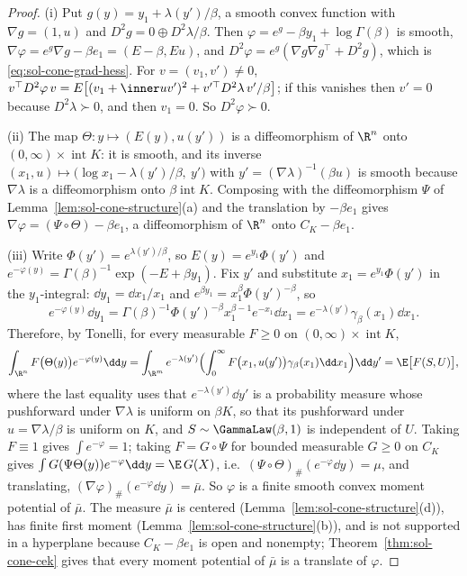 \documentclass[../main.tex]{subfiles}
\begin{document}
\begin{proof}
(i) Put $g(y)=y_1+\lambda(y')/\beta$, a smooth convex function with
$\nabla g=(1,u)$ and $D^2g=0\oplus D^2\lambda/\beta$.  Then $\varphi=e^g-\beta y_1+\log\Gamma(\beta)$
is smooth, $\nabla\varphi=e^g\nabla g-\beta e_1=(E-\beta,Eu)$, and
$D^2\varphi=e^g(\nabla g\nabla g^\top+D^2g)$, which is \eqref{eq:sol-cone-grad-hess}.  For
$v=(v_1,v')\ne0$,
$v^\top D^2\varphi\,v=E\bigl[(v_1+\inner u{v'})^2+v'^\top D^2\lambda\,v'/\beta\bigr]$; if this
vanishes then $v'=0$ because $D^2\lambda\succ0$, and then $v_1=0$.  So $D^2\varphi\succ0$.

(ii) The map $\Theta:y\mapsto(E(y),u(y'))$ is a diffeomorphism of $\R^n$ onto
$(0,\infty)\times\operatorname{int}K$: it is smooth, and its inverse
$(x_1,u)\mapsto\bigl(\log x_1-\lambda(y')/\beta,\ y'\bigr)$ with $y'=(\nabla\lambda)^{-1}(\beta u)$
is smooth because $\nabla\lambda$ is a diffeomorphism onto $\beta\operatorname{int}K$.
Composing with the diffeomorphism $\Psi$ of Lemma~\ref{lem:sol-cone-structure}(a) and the
translation by $-\beta e_1$ gives $\nabla\varphi=(\Psi\circ\Theta)-\beta e_1$, a diffeomorphism
of $\R^n$ onto $C_K-\beta e_1$.

(iii) Write $\Phi(y')=e^{\lambda(y')/\beta}$, so $E(y)=e^{y_1}\Phi(y')$ and
$e^{-\varphi(y)}=\Gamma(\beta)^{-1}\exp(-E+\beta y_1)$.  Fix $y'$ and substitute
$x_1=e^{y_1}\Phi(y')$ in the $y_1$-integral: $\dd y_1=\dd x_1/x_1$ and
$e^{\beta y_1}=x_1^\beta\Phi(y')^{-\beta}$, so
\[
  e^{-\varphi(y)}\dd y_1
  =\Gamma(\beta)^{-1}\Phi(y')^{-\beta}x_1^{\beta-1}e^{-x_1}\dd x_1
  =e^{-\lambda(y')}\gamma_\beta(x_1)\dd x_1 .
\]
Therefore, by Tonelli, for every measurable $F\ge0$ on $(0,\infty)\times\operatorname{int}K$,
\begin{equation}
  \int_{\R^n}F\bigl(\Theta(y)\bigr)e^{-\varphi(y)}\dd y
  =\int_{\R^m}e^{-\lambda(y')}\Bigl(\int_0^\infty F\bigl(x_1,u(y')\bigr)\gamma_\beta(x_1)\dd x_1\Bigr)\dd y'
  =\E\bigl[F(S,U)\bigr],
  \label{eq:sol-cone-pushforward}
\end{equation}
where the last equality uses that $e^{-\lambda(y')}\dd y'$ is a probability measure whose
pushforward under $\nabla\lambda$ is uniform on $\beta K$, so that its pushforward under
$u=\nabla\lambda/\beta$ is uniform on $K$, and $S\sim\GammaLaw(\beta,1)$ is independent of $U$.
Taking $F\equiv1$ gives $\int e^{-\varphi}=1$; taking $F=G\circ\Psi$ for bounded measurable
$G\ge0$ on $C_K$ gives $\int G(\Psi\Theta(y))e^{-\varphi}\dd y=\E\,G(X)$, i.e.\
$(\Psi\circ\Theta)_\#(e^{-\varphi}\dd y)=\mu$, and translating,
$(\nabla\varphi)_\#(e^{-\varphi}\dd y)=\bar\mu$.  So $\varphi$ is a finite smooth convex
moment potential of $\bar\mu$.  The measure $\bar\mu$ is centered
(Lemma~\ref{lem:sol-cone-structure}(d)), has finite first moment
(Lemma~\ref{lem:sol-cone-structure}(b)), and is not supported in a hyperplane because
$C_K-\beta e_1$ is open and nonempty; Theorem~\ref{thm:sol-cone-cek} gives that every moment
potential of $\bar\mu$ is a translate of $\varphi$.


\end{proof}
\end{document}

